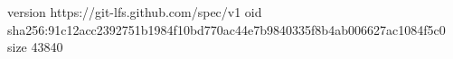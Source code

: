 version https://git-lfs.github.com/spec/v1
oid sha256:91c12acc2392751b1984f10bd770ac44e7b9840335f8b4ab006627ac1084f5c0
size 43840
